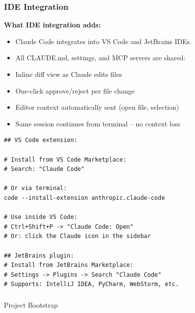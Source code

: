 \begin{frame}[fragile]\frametitle{IDE Integration}
\textbf{What IDE integration adds:}
  \begin{itemize}
	\item Claude Code integrates into VS Code and JetBrains IDEs. 
	\item All CLAUDE.md, settings, and MCP servers are shared:
    \item Inline diff view as Claude edits files
    \item One-click approve/reject per file change
    \item Editor context automatically sent (open file, selection)
    \item Same session continues from terminal -- no context loss
  \end{itemize}
  
\begin{lstlisting}
## VS Code extension:

# Install from VS Code Marketplace:
# Search: "Claude Code"

# Or via terminal:
code --install-extension anthropic.claude-code

# Use inside VS Code:
# Ctrl+Shift+P -> "Claude Code: Open"
# Or: click the Claude icon in the sidebar

## JetBrains plugin:
# Install from JetBrains Marketplace:
# Settings -> Plugins -> Search "Claude Code"
# Supports: IntelliJ IDEA, PyCharm, WebStorm, etc.
\end{lstlisting}


\end{frame}

\begin{frame}[fragile]\frametitle{}
\begin{center}
{\Large Project Bootstrap}

\end{center}
\end{frame}


